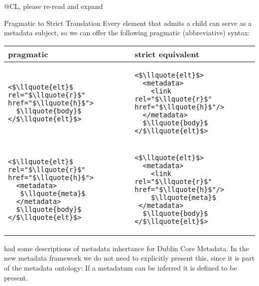 \begin{module}[id=genmeta]
\begin{omgroup}[creators={miko,clange},short={Metadata},id=metadatachap]
\begin{newpart}{@CL, please re-read and expand}
\begin{omgroup}{Pragmatic to Strict Translation}
  Every \omdoc element that admits a  child can serve as a metadata
  subject, so we can offer the following pragmatic (abbreviative) syntax:
\begin{center}\lstset{frame=none,numbers=none,lineskip=-.7ex,aboveskip=-.5em,belowskip=-1em,mathescape}
 \begin{tabular}{|p{5cm}|p{5cm}|}\hline
    pragmatic & strict equivalent\\\hline
\begin{lstlisting}
<$\llquote{elt}$ rel="$\llquote{r}$" href="$\llquote{h}$">
  $\llquote{body}$
</$\llquote{elt}$>
\end{lstlisting}
&
\begin{lstlisting}
<$\llquote{elt}$>
  <metadata>
    <link rel="$\llquote{r}$" href="$\llquote{h}$"/>
  </metadata>
  $\llquote{body}$
</$\llquote{elt}$>
\end{lstlisting}
\\\hline 
\begin{lstlisting}
<$\llquote{elt}$ rel="$\llquote{r}$" href="$\llquote{h}$">
  <metadata>
   $\llquote{meta}$
  </metadata>
  $\llquote{body}$
</$\llquote{elt}$>
\end{lstlisting}
&
\begin{lstlisting}
<$\llquote{elt}$>
  <metadata>
    <link rel="$\llquote{r}$" href="$\llquote{h}$"/>
    $\llquote{meta}$
 </metadata>
  $\llquote{body}$
</$\llquote{elt}$>
\end{lstlisting}
\\\hline 
\end{tabular}
\end{center}
\end{omgroup}


{} had some descriptions of metadata inhertance for Dublin Core Metadata. In
the new metadata framework we do not need to explicitly present this, since it is part of
the metadata ontology: If a metadatum can be inferred it is defined to be
present. 
\end{newpart}
\end{omgroup}
\end{module}


